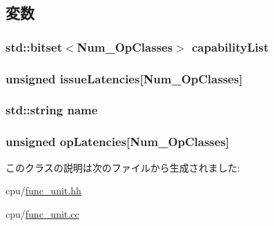 \subsection{変数}
\hypertarget{classFuncUnit_a7539c2a37351472e37845fdde96e3d37}{
\subsubsection[{capabilityList}]{\setlength{\rightskip}{0pt plus 5cm}std::bitset$<${\bf Num\_\-OpClasses}$>$ {\bf capabilityList}}}
\label{classFuncUnit_a7539c2a37351472e37845fdde96e3d37}
\hypertarget{classFuncUnit_ac2a9e9df0d9c429f6de7cc0d448fdeb3}{
\subsubsection[{issueLatencies}]{\setlength{\rightskip}{0pt plus 5cm}unsigned {\bf issueLatencies}\mbox{[}{\bf Num\_\-OpClasses}\mbox{]}}}
\label{classFuncUnit_ac2a9e9df0d9c429f6de7cc0d448fdeb3}
\hypertarget{classFuncUnit_a9b45b3e13bd9167aab02e17e08916231}{
\subsubsection[{name}]{\setlength{\rightskip}{0pt plus 5cm}std::string {\bf name}}}
\label{classFuncUnit_a9b45b3e13bd9167aab02e17e08916231}
\hypertarget{classFuncUnit_a28940a20f270bc01f3993dd2e8d4517f}{
\subsubsection[{opLatencies}]{\setlength{\rightskip}{0pt plus 5cm}unsigned {\bf opLatencies}\mbox{[}{\bf Num\_\-OpClasses}\mbox{]}}}
\label{classFuncUnit_a28940a20f270bc01f3993dd2e8d4517f}


このクラスの説明は次のファイルから生成されました:\begin{DoxyCompactItemize}
\item 
cpu/\hyperlink{func__unit_8hh}{func\_\-unit.hh}\item 
cpu/\hyperlink{func__unit_8cc}{func\_\-unit.cc}\end{DoxyCompactItemize}

